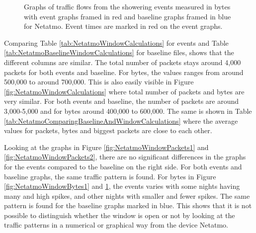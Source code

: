 \begin{figure}[H]
\begin{subfigure}[b]{0.47\textwidth}
        \centering
    \end{subfigure}
        \begin{subfigure}[b]{0.47\textwidth}
        \centering
    \end{subfigure}
    \begin{subfigure}[b]{0.47\textwidth}
        \centering
    \end{subfigure}
    \begin{subfigure}[b]{0.47\textwidth}
        \centering
    \end{subfigure}
    \hspace{0.6cm}
    \begin{subfigure}[b]{0.47\textwidth}
    \centering
        \end{subfigure}
    \caption{Graphs of traffic flows from the showering events measured in bytes with event graphs framed in red and baseline graphs framed in blue for Netatmo. Event times are marked in red on the event graphs.}  
    \label{fig:NetatmoWindowBytes2}
\end{figure}

Comparing Table \ref{tab:NetatmoWindowCalculations} for events and Table \ref{tab:NetatmoBaselineWindowCalculations} for baseline files, shows that the different columns are similar. The total number of packets stays around 4,000 packets for both events and baseline. For bytes, the values ranges from around 500,000 to around 700,000. This is also easily visible in Figure \ref{fig:NetatmoWindowCalculations} where total number of packets and bytes are very similar. For both events and baseline, the number of packets are around 3,000-5,000 and for bytes around 400,000 to 600,000. The same is shown in Table \ref{tab:NetatmoComparingBaselineAndWindowCalculations} where the average values for packets, bytes and biggest packets are close to each other. 

Looking at the graphs in Figure \ref{fig:NetatmoWindowPackets1} and \ref{fig:NetatmoWindowPackets2}, there are no significant differences in the graphs for the events compared to the baseline on the right side. For both events and baseline graphs, the same traffic pattern is found. For bytes in Figure \ref{fig:NetatmoWindowBytes1} and \ref{fig:NetatmoWindowBytes2}, the events varies with some nights having many and high spikes, and other nights with smaller and fewer spikes. The same pattern is found for the baseline graphs marked in blue. This shows that it is not possible to distinguish whether the window is open or not by looking at the traffic patterns in a numerical or graphical way from the device Netatmo. 

